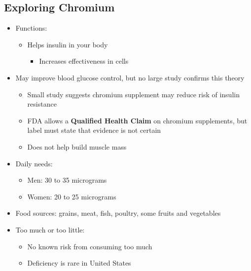 \documentclass[12pt]{article}
\begin{document}
        \subsection{Exploring Chromium}
            \begin{itemize}
                \item Functions:
                    \begin{itemize}
                        \item Helps insulin in your body
                            \begin{itemize}
                                \item Increases effectiveness in cells
                            \end{itemize}
                    \end{itemize}
                \item May improve blood glucose control, but no large study confirms this theory
                    \begin{itemize}
                        \item Small study suggests chromium supplement may reduce risk of insulin resistance
                        \item FDA allows a \textbf{Qualified Health Claim} on chromium supplements, but label must state that evidence is not certain
                        \item Does not help build muscle mass
                    \end{itemize}
                \item Daily needs:
                    \begin{itemize}
                        \item Men: 30 to 35 micrograms
                        \item Women: 20 to 25 micrograms
                    \end{itemize}
                \item Food sources: grains, meat, fish, poultry, some fruits and vegetables
                \item Too much or too little:
                    \begin{itemize}
                        \item No known risk from consuming too much
                        \item Deficiency is rare in United States
                    \end{itemize}
            \end{itemize}
\end{document}
